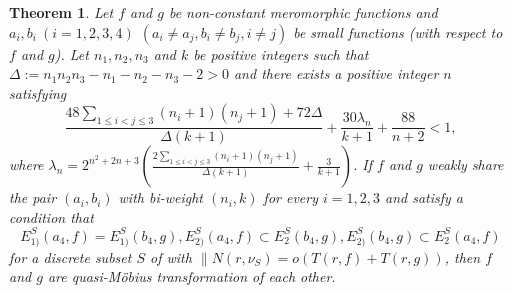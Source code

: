 \documentclass[10pt,a4paper]{amsart}
\newtheorem{theorem}{Theorem}
\begin{document}
\begin{theorem}\label{1.2}
Let $f$ and $g$ be non-constant meromorphic functions and $a_i,b_i\ (i=1,2,3,4)$ $ (a_i\ne a_j, b_i\ne b_j, i\ne j)$ be small functions (with respect to $f$ and $g$).  Let $n_1,n_2,n_3$ and $k$ be positive integers such that $\Delta:=n_1n_2n_3-n_1-n_2-n_3-2>0$ and there exists a positive integer $n$ satisfying
$$\frac{48\sum_{1\le i<j\le 3}(n_i+1)(n_j+1)+72\Delta}{\Delta(k+1)}+\frac{30\lambda_n}{k+1}+\frac{88}{n+2}<1,$$
where $\lambda_n=2^{n^2+2n+3}\left(\frac{2\sum_{1\le i<j\le 3}(n_i+1)(n_j+1)}{\Delta(k+1)}+\frac{3}{k+1}\right)$.
If $f$ and $g$ weakly share the pair $(a_i,b_i)$ with bi-weight $(n_i,k)$ for every $i=1,2,3$ and satisfy a condition that
$$E^S_{1)}(a_4,f)=E^S_{1)}(b_4,g),E^S_{2)}(a_4,f)\subset E^S_{2}(b_4,g),E^S_{2)}(b_4,g)\subset E^S_{2}(a_4,f)$$
for a discrete subset $S$ of with $\| N(r,\nu_S)=o(T(r,f)+T(r,g))$, then $f$ and $g$ are quasi-M\"{o}bius transformation of each other.
\end{theorem}
\end{document}
